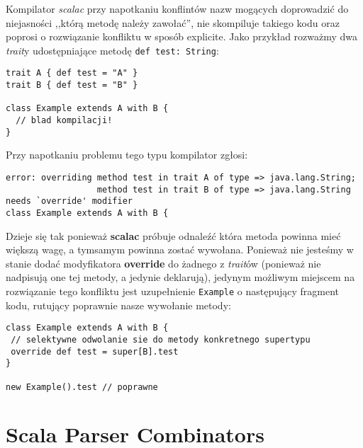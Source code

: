 Kompilator \textit{scalac} przy napotkaniu konflintów nazw mogących doprowadzić do niejasności ,,którą metodę należy zawołać'', nie skompiluje takiego kodu
oraz poprosi o rozwiązanie konfliktu w sposób explicite. Jako przykład rozważmy dwa \textit{trait}y udostępniające metodę \verb|def test: String|:

\begin{lstlisting}
trait A { def test = "A" }
trait B { def test = "B" }

class Example extends A with B {
  // blad kompilacji!
}
\end{lstlisting}

Przy napotkaniu problemu tego typu kompilator zgłosi:
\begin{verbatim}
error: overriding method test in trait A of type => java.lang.String;
                  method test in trait B of type => java.lang.String needs `override' modifier
class Example extends A with B {
\end{verbatim}

Dzieje się tak ponieważ \textbf{scalac} próbuje odnaleźć która metoda powinna mieć większą wagę, a tymsamym powinna zostać wywołana.
Ponieważ nie jesteśmy w stanie dodać modyfikatora \textbf{override} do żadnego z \textit{trait}ów (ponieważ nie nadpisują one tej metody, a jedynie deklarują),
jedynym możliwym miejscem na rozwiązanie tego konfliktu jest uzupełnienie \verb|Example| o następujący fragment kodu, rutujący poprawnie nasze wywołanie metody:

\begin{lstlisting}
class Example extends A with B {
 // selektywne odwolanie sie do metody konkretnego supertypu
 override def test = super[B].test
}

new Example().test // poprawne
\end{lstlisting}




\section{Scala Parser Combinators}
\label{sec:scala_parser_combinators}
